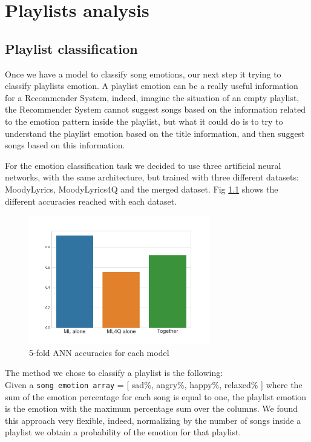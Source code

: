 \chapter{Playlists analysis}

\section{Playlist classification}
Once we have a model to classify song emotions, our next step it trying to classify playlists emotion. 
A playlist emotion can be a really useful information for a Recommender System, indeed, imagine the situation of an empty playlist, the Recommender System cannot suggest songs based on the information related to the emotion pattern inside the playlist, but what it could do is to try to understand the playlist emotion based on the title information, and then suggest songs based on this information. \par

For the emotion classification task we decided to use three artificial neural networks, with the same architecture, but trained with three different datasets: MoodyLyrics, MoodyLyrics4Q and the merged dataset. 
Fig \ref{fig:annacc} shows the different accuracies reached with each dataset. 

\begin{figure}[H]
\centering
\includegraphics[width=0.7\textwidth]{./chapters/chapter5/images/ANN_accuracies.png}
\caption{5-fold ANN accuracies for each model}
\label{fig:annacc}
\end{figure}

The method we chose to classify a playlist is the following: \\
Given a \texttt{song emotion array} = [ sad\%, angry\%, happy\%, relaxed\% ] where the sum of the emotion percentage for each song is equal to one, the playlist emotion is the emotion with the maximum percentage sum over the columns. We found this approach very flexible, indeed, normalizing by the number of songs inside a playlist we obtain a probability of the emotion for that playlist. \par

